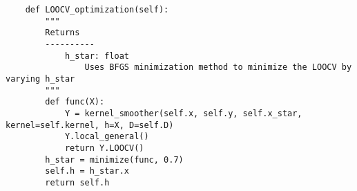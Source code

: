 \documentclass[10pt]{article}
\begin{document}
\begin{lstlisting}
    def LOOCV_optimization(self):
        """
        Returns
        ----------
            h_star: float
                Uses BFGS minimization method to minimize the LOOCV by varying h_star
        """
        def func(X):
            Y = kernel_smoother(self.x, self.y, self.x_star, kernel=self.kernel, h=X, D=self.D)
            Y.local_general()
            return Y.LOOCV()
        h_star = minimize(func, 0.7)
        self.h = h_star.x
        return self.h
        \end{lstlisting}
\end{document}
